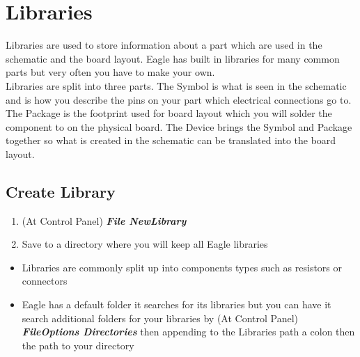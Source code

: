 \documentclass{article}
\begin{document}
\section{Libraries}
Libraries are used to store information about a part which are used in the
schematic and the board layout. Eagle has built in libraries for many common
parts but very often you have to make your own.\\
Libraries are split into three parts. The Symbol is what is seen in the
schematic and is how you describe the pins on your part which electrical
connections go to. The Package is the footprint used for board layout which you
will solder the component to on the physical board. The Device brings the Symbol
and Package together so what is created in the schematic can be translated
into the board layout.

\subsection{Create Library} \label{create library}
\begin{enumerate}
    \item (At Control Panel) \textit{\textbf{File\textrightarrow
    New\textrightarrow Library}}
    \item Save to a directory where you will keep all Eagle libraries
\end{enumerate}
\begin{tcolorbox} [title=Tips \& Tricks]
    \begin{itemize}
        \item Libraries are commonly split up into components types such as
        resistors or connectors
        \item Eagle has a default folder it searches for its libraries but you
        can have it search additional folders for your libraries by (At Control
        Panel) \textit{\textbf{File\textrightarrow Options\textrightarrow
        Directories}} then appending to the Libraries path a colon then the path
        to your directory
    \end{itemize}
\end{tcolorbox}
\end{document}
